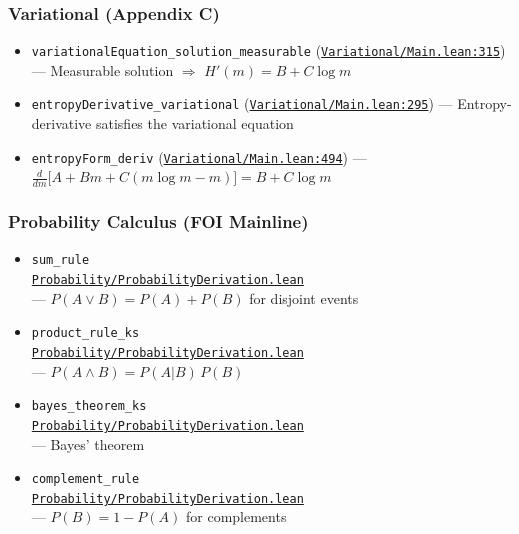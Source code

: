 \documentclass[11pt]{article}
\theoremstyle{definition}
\theoremstyle{remark}
\begin{document}
\subsubsection*{Variational (Appendix C)}
\begin{itemize}
\item \texttt{variationalEquation\_solution\_measurable} (\href{https://github.com/zariuq/ks-foundations-of-inference/blob/main/KnuthSkilling/Variational/Main.lean\#L315}{\texttt{Variational/Main.lean:315}}) --- Measurable solution $\Rightarrow$ $H'(m) = B + C \log m$
\item \texttt{entropyDerivative\_variational} (\href{https://github.com/zariuq/ks-foundations-of-inference/blob/main/KnuthSkilling/Variational/Main.lean\#L295}{\texttt{Variational/Main.lean:295}}) --- Entropy-derivative satisfies the variational equation
\item \texttt{entropyForm\_deriv} (\href{https://github.com/zariuq/ks-foundations-of-inference/blob/main/KnuthSkilling/Variational/Main.lean\#L494}{\texttt{Variational/Main.lean:494}}) --- $\frac{d}{dm}\big[A + Bm + C(m\log m - m)\big] = B + C\log m$
\end{itemize}

\subsubsection*{Probability Calculus (FOI Mainline)}
\begin{itemize}
\item \texttt{sum\_rule}\\
      \href{https://github.com/zariuq/ks-foundations-of-inference/blob/main/KnuthSkilling/Probability/ProbabilityDerivation.lean}{\texttt{Probability/ProbabilityDerivation.lean}}\\
      --- $P(A \vee B) = P(A) + P(B)$ for disjoint events
\item \texttt{product\_rule\_ks}\\
      \href{https://github.com/zariuq/ks-foundations-of-inference/blob/main/KnuthSkilling/Probability/ProbabilityDerivation.lean}{\texttt{Probability/ProbabilityDerivation.lean}}\\
      --- $P(A \wedge B) = P(A|B)\,P(B)$
\item \texttt{bayes\_theorem\_ks}\\
      \href{https://github.com/zariuq/ks-foundations-of-inference/blob/main/KnuthSkilling/Probability/ProbabilityDerivation.lean}{\texttt{Probability/ProbabilityDerivation.lean}}\\
      --- Bayes' theorem
\item \texttt{complement\_rule}\\
      \href{https://github.com/zariuq/ks-foundations-of-inference/blob/main/KnuthSkilling/Probability/ProbabilityDerivation.lean}{\texttt{Probability/ProbabilityDerivation.lean}}\\
      --- $P(B)=1-P(A)$ for complements
\end{itemize}
\end{document}

